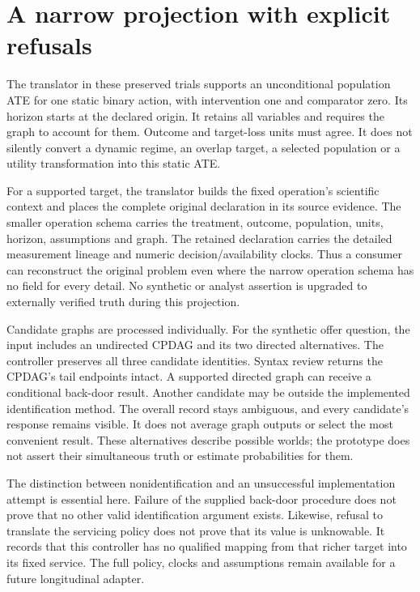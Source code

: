 \section{A narrow projection with explicit refusals}

The translator in these preserved trials supports an unconditional population ATE for one
static binary action, with intervention one and comparator zero. Its horizon
starts at the declared origin. It retains all variables and requires the graph
to account for them. Outcome and target-loss units must agree. It does not
silently convert a dynamic regime, an overlap target, a selected population or
a utility transformation into this static ATE.

For a supported target, the translator builds the fixed operation's scientific
context and places the complete original declaration in its source evidence.
The smaller operation schema carries the treatment, outcome, population, units,
horizon, assumptions and graph. The retained declaration carries the detailed
measurement lineage and numeric decision/availability clocks. Thus a consumer
can reconstruct the original problem even where the narrow operation schema
has no field for every detail. No synthetic or analyst assertion is upgraded to
externally verified truth during this projection.

Candidate graphs are processed individually. For the synthetic offer question,
the input includes an undirected CPDAG and its two directed alternatives. The
controller preserves all three candidate identities. Syntax review returns the
CPDAG's tail endpoints intact. A supported directed graph can receive a
conditional back-door result. Another candidate may be outside the implemented
identification method. The overall record stays ambiguous, and every candidate's
response remains visible. It does not average graph outputs or select the most
convenient result. These alternatives describe possible worlds; the prototype
does not assert their simultaneous truth or estimate probabilities for them.

The distinction between nonidentification and an unsuccessful implementation
attempt is essential here. Failure of the supplied back-door procedure does
not prove that no other valid identification argument exists. Likewise, refusal
to translate the servicing policy does not prove that its value is unknowable.
It records that this controller has no qualified mapping from that richer
target into its fixed service. The full policy, clocks and assumptions remain
available for a future longitudinal adapter.

